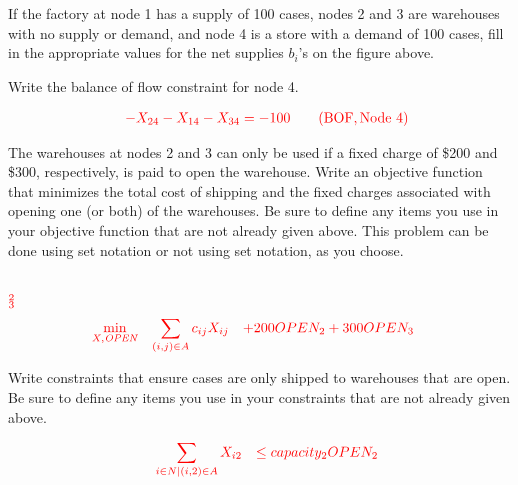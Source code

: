\begin{parts}
If the factory at node 1 has a supply of 100 cases, nodes 2 and 3 are warehouses with no supply or demand, and node 4 is a store with a demand of 100 cases, fill in the appropriate values for the net supplies $b_i$'s on the figure above.

\vspace{0.25cm}

 Write the balance of flow constraint for node 4.

 \[
    \begin{array}{llll}

& \textcolor{red}{- X_{24} - X_{14} - X_{34}= -100} & & {\rm \textcolor{red}{(BOF, Node~4)}}\\
    \end{array}
    \]

 The warehouses at nodes 2 and 3 can only be used if a fixed charge of \$200 and \$300, respectively, is paid to open the warehouse. Write an objective function that minimizes the total cost of shipping and the fixed charges associated with opening one (or both) of the warehouses.  Be sure to define any items you use in your objective function that are not already given above. This problem can be done using set notation or not using set notation, as you choose. 

\vspace{0.5cm}

\noindent\underline{}
\\
$\textcolor{red}{_{2}}$    \\
$\textcolor{red}{_{3}}$    \\

\[
    \begin{array}{llll}
      \displaystyle\textcolor{red}{\min_{ \tiny{\it X, OPEN}}} & \displaystyle\textcolor{red}{\sum_{(i,j) \in A} c_{ij} X_{ij}} & \textcolor{red}{+  200 OPEN_2 + 300 OPEN_3} & \\
    \end{array}
    \]

\vfill 

 Write constraints that ensure cases are only shipped to warehouses that are open.  Be sure to define any items you use in your constraints that are not already given above.

\[
    \begin{array}{llll}
    & \displaystyle\textcolor{red}{\sum_{i \in N|(i,2) \in A} X_{i2}} & \textcolor{red}{\le capacity_2 OPEN_2} \\
    \end{array}
    \]


\end{parts}
